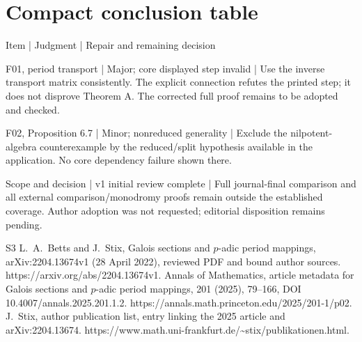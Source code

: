 \documentclass[10pt]{article}
\begin{document}
\section*{Compact conclusion table}
Item | Judgment | Repair and remaining decision\par
F01, period transport | Major; core displayed step invalid | Use the inverse transport matrix consistently. The explicit connection refutes the printed step; it does not disprove Theorem A. The corrected full proof remains to be adopted and checked.\par
F02, Proposition 6.7 | Minor; nonreduced generality | Exclude the nilpotent-algebra counterexample by the reduced/split hypothesis available in the application. No core dependency failure shown there.\par
Scope and decision | v1 initial review complete | Full journal-final comparison and all external comparison/monodromy proofs remain outside the established coverage. Author adoption was not requested; editorial disposition remains pending.\par
S3 L. A. Betts and J. Stix, Galois sections and \(p\)-adic period mappings, arXiv:2204.13674v1 (28 April 2022), reviewed PDF and bound author sources. https://arxiv.org/abs/2204.13674v1. Annals of Mathematics, article metadata for Galois sections and \(p\)-adic period mappings, 201 (2025), 79–166, DOI 10.4007/annals.2025.201.1.2. https://annals.math.princeton.edu/2025/201-1/p02. J. Stix, author publication list, entry linking the 2025 article and arXiv:2204.13674. https://www.math.uni-frankfurt.de/\textasciitilde{}stix/publikationen.html.\par
\end{document}

